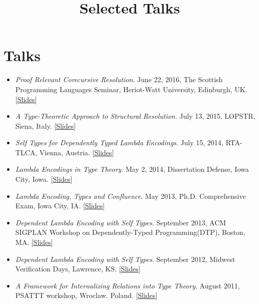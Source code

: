 \documentclass[10pt]{article}
\title{\bfseries\Large Selected Talks}
\date{}
\begin{document}
\maketitle
\vspace{-4em}

\vspace{20pt}
\section*{Talks}
\begin{itemize}
\item \textit{Proof Relevant Corecursive Resolution}. June 22, 2016, The Scottish Programming Languages Seminar, Heriot-Watt University, Edinburgh, UK. [\href{../../document/talks/spls-2016.pdf}{Slides}]

\item \textit{A Type-Theoretic Approach to Structural Resolution}. July 13, 2015, LOPSTR, Siena, Italy. [\href{../../document/talks/lopstr-2015.pdf}{Slides}]

\item \textit{Self Types for Dependently Typed Lambda Encodings}. July 15, 2014, RTA-TLCA, Vienna, Austria. [\href{../../document/talks/rta-tlca-14.pdf}{Slides}]
\item \textit{Lambda Encodings in Type Theory}. May 2, 2014, Dissertation Defense, Iowa City, Iowa. [\href{../../document/talks/thesis-talk.pdf}{Slides}]
\item \textit{Lambda Encoding, Types and Confluence}. May 2013, Ph.D. Comprehensive Exam, Iowa City, IA. [\href{../../document/talks/comp.pdf}{Slides}]
\item \textit{Dependent Lambda Encoding with Self Types}. September 2013, ACM SIGPLAN Workshop on Dependently-Typed Programming(DTP), Boston, MA. [\href{../../document/talks/dtp-2013.pdf}{Slides}]
\item \textit{Dependent Lambda Encoding with Self Types}. September 2012, Midwest Verification Days, Lawrence, KS. [\href{../../document/talks/mvd-2012.pdf}{Slides}]

\item \textit{A Framework for Internalizing Relations into Type Theory}. August 2011, PSATTT workshop, Wroclaw. Poland. [\href{../../document/talks/psattt11-talk.pdf}{Slides}]
\end{itemize}
\end{document}
